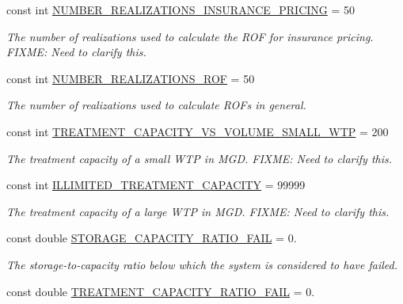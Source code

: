 \begin{DoxyCompactItemize}
const int \mbox{\hyperlink{classConstants_a81043bd68881023e5ad54e3bc1e5366f}{N\+U\+M\+B\+E\+R\+\_\+\+R\+E\+A\+L\+I\+Z\+A\+T\+I\+O\+N\+S\+\_\+\+I\+N\+S\+U\+R\+A\+N\+C\+E\+\_\+\+P\+R\+I\+C\+I\+NG}} = 50
\begin{DoxyCompactList}\small\item\em The number of realizations used to calculate the R\+OF for insurance pricing. F\+I\+X\+ME\+: Need to clarify this. \end{DoxyCompactList}\item 
const int \mbox{\hyperlink{classConstants_ad6b1922ee031afa4b93176968d060fdf}{N\+U\+M\+B\+E\+R\+\_\+\+R\+E\+A\+L\+I\+Z\+A\+T\+I\+O\+N\+S\+\_\+\+R\+OF}} = 50
\begin{DoxyCompactList}\small\item\em The number of realizations used to calculate R\+O\+Fs in general. \end{DoxyCompactList}\item 
const int \mbox{\hyperlink{classConstants_ae054475fbe2eafea2a6417bddf4d07c9}{T\+R\+E\+A\+T\+M\+E\+N\+T\+\_\+\+C\+A\+P\+A\+C\+I\+T\+Y\+\_\+\+V\+S\+\_\+\+V\+O\+L\+U\+M\+E\+\_\+\+S\+M\+A\+L\+L\+\_\+\+W\+TP}} = 200
\begin{DoxyCompactList}\small\item\em The treatment capacity of a small W\+TP in M\+GD. F\+I\+X\+ME\+: Need to clarify this. \end{DoxyCompactList}\item 
const int \mbox{\hyperlink{classConstants_a878f191b27592c59c7d708412dee03af}{I\+L\+L\+I\+M\+I\+T\+E\+D\+\_\+\+T\+R\+E\+A\+T\+M\+E\+N\+T\+\_\+\+C\+A\+P\+A\+C\+I\+TY}} = 99999
\begin{DoxyCompactList}\small\item\em The treatment capacity of a large W\+TP in M\+GD. F\+I\+X\+ME\+: Need to clarify this. \end{DoxyCompactList}\item 
const double \mbox{\hyperlink{classConstants_a70548c8633a7d66b6bae5178050ed0bb}{S\+T\+O\+R\+A\+G\+E\+\_\+\+C\+A\+P\+A\+C\+I\+T\+Y\+\_\+\+R\+A\+T\+I\+O\+\_\+\+F\+A\+IL}} = 0.
\begin{DoxyCompactList}\small\item\em The storage-\/to-\/capacity ratio below which the system is considered to have failed. \end{DoxyCompactList}\item 
const double \mbox{\hyperlink{classConstants_a46c9ebb6c42fca2994f2caf1db259896}{T\+R\+E\+A\+T\+M\+E\+N\+T\+\_\+\+C\+A\+P\+A\+C\+I\+T\+Y\+\_\+\+R\+A\+T\+I\+O\+\_\+\+F\+A\+IL}} = 0.

\end{DoxyCompactItemize}
